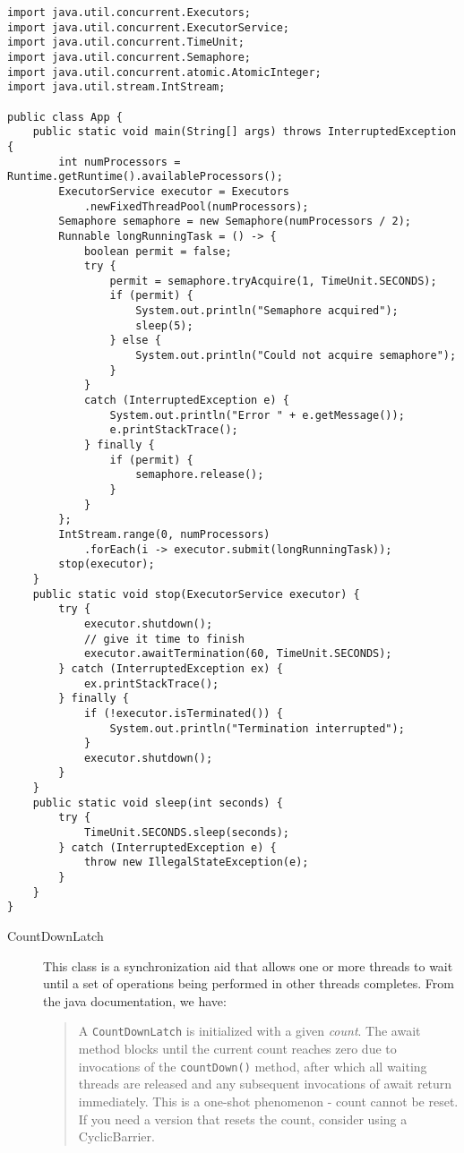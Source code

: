 \documentclass{latex/classes/myarticle}
\begin{document}
\begin{lstlisting}
import java.util.concurrent.Executors;
import java.util.concurrent.ExecutorService;
import java.util.concurrent.TimeUnit;
import java.util.concurrent.Semaphore;
import java.util.concurrent.atomic.AtomicInteger;
import java.util.stream.IntStream;

public class App {
    public static void main(String[] args) throws InterruptedException {
        int numProcessors = Runtime.getRuntime().availableProcessors();
        ExecutorService executor = Executors
            .newFixedThreadPool(numProcessors);
        Semaphore semaphore = new Semaphore(numProcessors / 2);
        Runnable longRunningTask = () -> {
            boolean permit = false;
            try {
                permit = semaphore.tryAcquire(1, TimeUnit.SECONDS);
                if (permit) {
                    System.out.println("Semaphore acquired");
                    sleep(5);
                } else {
                    System.out.println("Could not acquire semaphore");
                }
            }
            catch (InterruptedException e) {
                System.out.println("Error " + e.getMessage());
                e.printStackTrace();
            } finally {
                if (permit) {
                    semaphore.release();
                }
            }
        };
        IntStream.range(0, numProcessors)
            .forEach(i -> executor.submit(longRunningTask));
        stop(executor);
    }
    public static void stop(ExecutorService executor) {
        try {
            executor.shutdown();
            // give it time to finish
            executor.awaitTermination(60, TimeUnit.SECONDS);
        } catch (InterruptedException ex) {
            ex.printStackTrace();
        } finally {
            if (!executor.isTerminated()) {
                System.out.println("Termination interrupted");
            }
            executor.shutdown();
        }
    }
    public static void sleep(int seconds) {
        try {
            TimeUnit.SECONDS.sleep(seconds);
        } catch (InterruptedException e) {
            throw new IllegalStateException(e);
        }
    }
}
\end{lstlisting}


\begin{description}
\item[{CountDownLatch}] This class is a synchronization aid that allows one or
more threads to wait until a set of operations being performed in other
threads completes. From the java documentation, we have:

\begin{quote}
A \texttt{CountDownLatch} is initialized with a given \emph{count}. The await method
blocks until the current count reaches zero due to invocations of the
\texttt{countDown()} method, after which all waiting threads are released and any
subsequent invocations of await return immediately. This is a one-shot
phenomenon - count cannot be reset. If you need a version that resets the
count, consider using a CyclicBarrier.
\end{quote}
\end{description}
\end{document}
